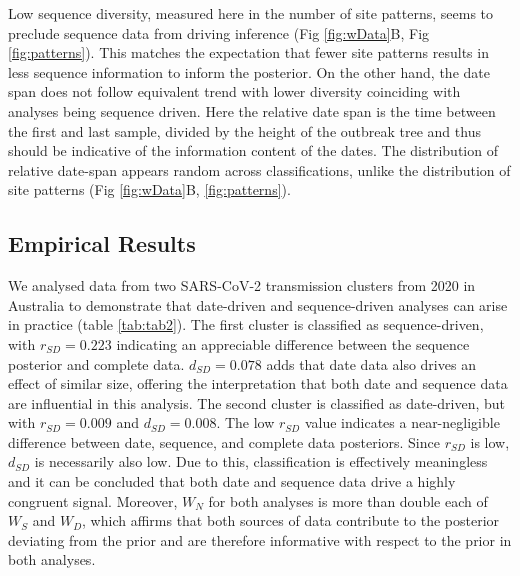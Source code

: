 \documentclass{article}
\begin{document}
Low sequence diversity, measured here in the number of site patterns, seems to preclude sequence data from driving inference (Fig \ref{fig:wData}B, Fig \ref{fig:patterns}). This matches the expectation that fewer site patterns results in less sequence information to inform the posterior. On the other hand, the date span  does not follow equivalent trend with lower diversity coinciding with analyses being sequence driven. Here the relative date span is the time between the first and last sample, divided by the height of the outbreak tree and thus should be indicative of the information content of the dates. The distribution of relative date-span appears random across classifications, unlike the distribution of site patterns (Fig \ref{fig:wData}B, \ref{fig:patterns}).

\subsection*{Empirical Results}
We analysed data from two SARS-CoV-2 transmission clusters from 2020 in Australia to demonstrate that date-driven and sequence-driven analyses can arise in practice (table \ref{tab:tab2}). The first cluster is classified as sequence-driven, with $r_{SD} = 0.223$ indicating an appreciable difference between the sequence posterior and complete data. $d_{SD} = 0.078$ adds that date data also drives an effect of similar size, offering the interpretation that both date and sequence data are influential in this analysis. The second cluster is  classified as date-driven, but with $r_{SD} = 0.009$ and $d_{SD}=0.008$. The low $r_{SD}$ value indicates a near-negligible difference between date, sequence, and complete data posteriors. Since $r_{SD}$ is low, $d_{SD}$ is necessarily also low. Due to this, classification is effectively meaningless and it can be concluded that both date and sequence data drive a highly congruent signal. Moreover, $W_N$ for both analyses is more than double each of $W_S$ and $W_D$, which affirms that both sources of data contribute to the posterior deviating from the prior and are therefore informative with respect to the prior in both analyses.
\end{document}
